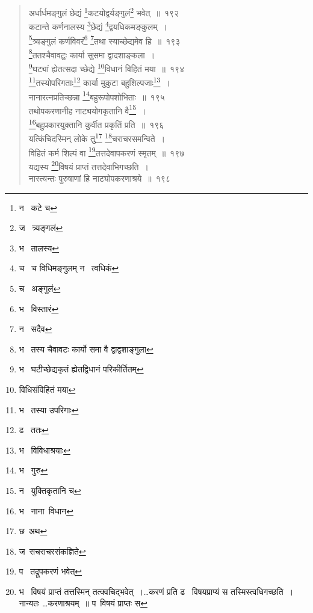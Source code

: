 \documentclass[11pt, openany]{book}
\begin{document}
\newpage

\begin{quote}
{\na अर्धार्धमङ्गुलं छेद्यं \renewcommand{\thefootnote}{1}\footnote{न \textendash\ कटे च}कटयोद्वर्यङ्गुलं\renewcommand{\thefootnote}{2}\footnote{ज \textendash\ त्र्यङ्गलं} भवेत्~॥~१९२\\
कटान्ते कर्णनालस्य \renewcommand{\thefootnote}{3}\footnote{भ \textendash\ तालस्य}छेद्यं \renewcommand{\thefootnote}{4}\footnote{च \textendash\ च विधिमङ्गुलम् न \textendash\ त्वधिकं}द्वयधिकमङ्कुलम्~।\\
\renewcommand{\thefootnote}{5}\footnote{च \textendash\ अङ्गुलं}त्र्यङ्गुलं कर्णविवरं\renewcommand{\thefootnote}{6}\footnote{भ \textendash\ विस्तारं} \renewcommand{\thefootnote}{7}\footnote{न \textendash\ सदैव}तथा स्याच्छेद्यमेव हि~॥~१९३\\
\renewcommand{\thefootnote}{8}\footnote{भ \textendash\ तस्य चैवावटः कार्यो समा वै द्वाद्वशाङ्गुला}ततश्चैवावटुः कार्या सुसमा द्वादशाङ्कला~।\\
\renewcommand{\thefootnote}{9}\footnote{भ \textendash\ घटीच्छेद्यकृतं ह्येतद्विधानं परिकीर्तितम्}घट्यां ह्येतत्सदा च्छेद्ये \renewcommand{\thefootnote}{10}\footnote{विधिसंविहितं मया}विधानं विहितं मया~॥~१९४\\
\renewcommand{\thefootnote}{11}\footnote{भ \textendash\ तस्या उपरिगाः}तस्योपरिगताः\renewcommand{\thefootnote}{12}\footnote{ढ \textendash\ ततः} कार्या मुकुटा बहुशिल्पजाः\renewcommand{\thefootnote}{13}\footnote{भ \textendash\ विविधाश्रयाः}~।\\
नानारत्नप्रतिच्छन्ना \renewcommand{\thefootnote}{14}\footnote{भ \textendash\ गुरु}बहुरूपोपशोभिताः~॥~१९५\\
तथोपकरणानीह नाट्ययोगकृतानि वै\renewcommand{\thefootnote}{15}\footnote{न \textendash\ युक्तिकृतानि च}~।\\
\renewcommand{\thefootnote}{16}\footnote{भ \textendash\ नाना\textendash\ विधान}बहुप्रकारयुक्तानि कुर्वीत प्रकृतिं प्रति~॥~१९६\\
यत्किंचिदस्मिन् लोके तु\renewcommand{\thefootnote}{17}\footnote{छ\textendash\ अथ} \renewcommand{\thefootnote}{18}\footnote{ज\textendash\ सचराचरसंकज्ञिते}चराचरसमन्विते~।\\
विहितं कर्म शिल्पं वा \renewcommand{\thefootnote}{19}\footnote{प \textendash\ तद्रूपकरणं भवेत्}तत्तदेवापकरणं स्मृतम्~॥~१९७\\
यद्यस्य \renewcommand{\thefootnote}{20}\footnote{भ \textendash\ विषयं प्राप्तं तत्तस्मिन् तत्क्वचिद्भवेत्~।\ldots करणं प्रति ढ \textendash\ विषयप्राप्यं स तस्मिस्त्वधिगच्छति~। नान्यतः \ldots करणाश्रयम्~॥ प\textendash\ विषयं प्राप्तः स}विषयं प्राप्तं तत्तदेवाभिगच्छति~।\\
नास्त्यन्तः पुरुषाणां हि नाट्योपकरणाश्रये~॥~१९८}
\end{quote}
\end{document}
